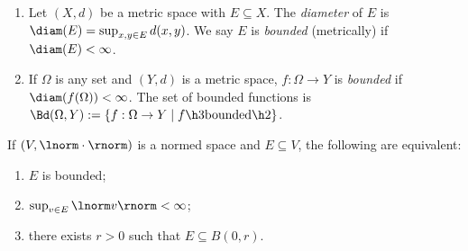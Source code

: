     \begin{definition}
        \phantom{a}
        \begin{enumerate}[label = (\arabic*),itemsep=1pt,topsep=3pt]
            \item Let $(X,d)$ be a metric space with $E \subseteq X$. The \textit{diameter} of $E$ is $\diam(E) = \sup_{x,y \in E}d(x,y)$. We say $E$ is \textit{bounded} (metrically) if $\diam(E) < \infty$.
            \item If $\Omega$ is any set and $(Y,d)$ is a metric space, $f:\Omega \rightarrow Y$ is \textit{bounded} if \newline $\diam(f(\Omega))<\infty$. The set of bounded functions is $\Bd(\Omega,Y):= \{f:\Omega \rightarrow Y \mid f \h3\text{bounded}\h2 \} $.
        \end{enumerate}
    \end{definition}

    \begin{exercise}
        If $(V,\lnorm \cdot \rnorm)$ is a normed space and $E \subseteq V$, the following are equivalent:
            \begin{enumerate}[label = (\arabic*),itemsep=1pt,topsep=3pt]
                \item $E$ is bounded;
                \item $\sup_{v \in E}\lnorm v \rnorm < \infty$;
                \item there exists $r > 0$ such that $E \subseteq B(0,r)$.
            \end{enumerate}
    \end{exercise}


